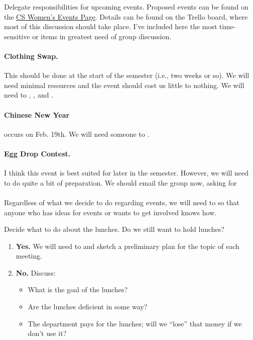 \documentclass{agenda}
\begin{document}
\begin{agendaitem}{15}{Delegate responsibilities for upcoming events.}
    Proposed events can be found on the \href{http://umasscswomen.weebly.com/events.html}{\underline{CS Women's Events Page}}. Details can be found on the Trello board, where most of this discussion should take place. I've included here the most time-sensitive or items in greatest need of group discussion. 
    
    \paragraph{Clothing Swap.} This should be done at the start of the semester (i.e., two weeks or so). We will need minimal resources and the event should cost us little to nothing. We will need to , , and . 
    
    \paragraph{Chinese New Year} occurs on Feb. 19th. We will need someone to . 
     
    \paragraph{Egg Drop Contest.} I think this event is best suited for later in the semester. However, we will need to do quite a bit of preparation. We should email the group now, asking for 
\\\\    
       Regardless of what we decide to do regarding events, we will need to  so that anyone who has ideas for events or wants to get involved knows how. 
\end{agendaitem}

\begin{agendaitem}{15}{Decide what to do about the lunches.}
    Do we still want to hold lunches?
    \begin{enumerate}
        \item {\bf Yes.} We will need to  and sketch a preliminary 
        plan for the topic of each meeting.
        \item {\bf No.} Discuss:
            \begin{itemize}
                \item What is the goal of the lunches?
                \item Are the lunches deficient in some way?
                \item The department pays for the lunches; will we ``lose'' that money if we don't use it?
            \end{itemize}
    \end{enumerate}
\end{agendaitem}
\end{document}
